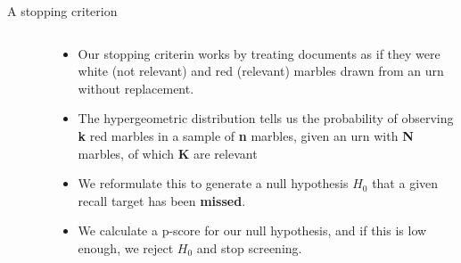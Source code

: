 \documentclass[9pt,aspectratio=169]{beamer}
\begin{document}
\begin{frame}{A stopping criterion}
\begin{columns}
\begin{column}{0.382\linewidth}
\begin{figure}
		\end{figure}
	\end{column}
	\begin{column}{0.618\linewidth}
		\begin{itemize}
			\item<1-> Our stopping criterin works by treating documents as if they were white (not relevant) and red (relevant) marbles drawn from an urn without replacement.
			\item<2-> The hypergeometric distribution tells us the probability of observing \textbf{k} red marbles in a sample of \textbf{n} marbles, given an urn with \textbf{N} marbles, of which \textbf{K} are relevant
			\item<3-> We reformulate this to generate a null hypothesis $H_0$ that a given recall target has been \textbf{missed}. 
			\item<4-> We calculate a p-score for our null hypothesis, and if this is low enough, we reject $H_0$ and stop screening.
		\end{itemize}
	\end{column}

\end{columns}

\medskip

\bigskip


\end{frame}
\end{document}
